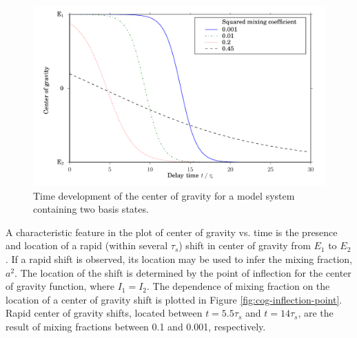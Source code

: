 \documentclass[12pt]{mitthesis}
\begin{document}
\begin{figure}
  \caption{Time development of the center of gravity for a model
    system containing two basis states.}
  \label{fig:cog-devel}
  \centering
  \includegraphics[width=6in]{cog-development.pdf}
\end{figure}

A characteristic feature in the plot of center of gravity vs. time is
the presence and location of a rapid (within several $\tau_s$) shift
in center of gravity from $E_1$ to $E_2$.  If a rapid shift is
observed, its location may be used to infer the mixing fraction,
$a^2$.  The location of the shift is determined by the point of
inflection for the center of gravity function, where $I_1=I_2$.  The
dependence of mixing fraction on the location of a center of gravity
shift is plotted in Figure \ref{fig:cog-inflection-point}.  Rapid
center of gravity shifts, located between $t=5.5\tau_s$ and
$t=14\tau_s$, are the result of mixing fractions between 0.1 and 0.001,
respectively.
\end{document}
